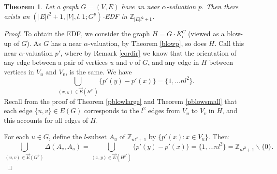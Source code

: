 \documentclass[12pt, a4paper]{article}
\newtheorem{theorem}{Theorem}[section]
\theoremstyle{definition}
\begin{document}
\begin{theorem}\label{thm:nearalpha-blowup}
Let a graph $G=(V,E)$ have an near $\alpha$-valuation $p$. Then there exists an $(|E|l^2 + 1, |V|, l, 1; G^p)$-EDF in $\mathbb{Z}_{|E|l^2+1}$.
\end{theorem}
\begin{proof}
To obtain the EDF, we consider the graph $H=G \cdot K_{l}^C$ (viewed as a blow-up of $G$).
As $G$ has a near $\alpha$-valuation, by Theorem \ref{blowp}, so does $H$.  Call this near $\alpha$-valuation $p'$, where by Remark \ref{cordir} we know that the orientation of any edge between a pair of vertices $u$ and $v$ of $G$, and any edge in $H$ between vertices in $V_u$ and $V_v$, is the same. We have 
$$\bigcup_{(x,y)\in \overrightarrow{E}(H^{p'})} \{p'(y)-p'(x)\} =\{1, \ldots nl^2\}.$$ 
Recall from the proof of Theorem \ref{pblowlarge} and Theorem \ref{pblowsmall} that each edge $\{u,v\} \in E(G)$ corresponds to the $l^2$ edges from $V_u$ to $V_v$ in $H$, and this accounts for all edges of $H$. 

For each $u \in G$, define the $l$-subset $A_u$ of $\mathbb{Z}_{nl^2+1}$ by $\{p'(x): x \in V_u\}$. Then:
    \[\bigcup_{(u,v)\in \overrightarrow{E}(G^p)} \Delta(A_v,A_u ) = \bigcup_{(x,y)\in \overrightarrow{E}(H^{p'})} \{p'(y)-p'(x)\}=\{1, \ldots nl^2\}=\mathbb{Z}_{nl^2+1}\backslash\{0\}.\]
\end{proof}
\end{document}

